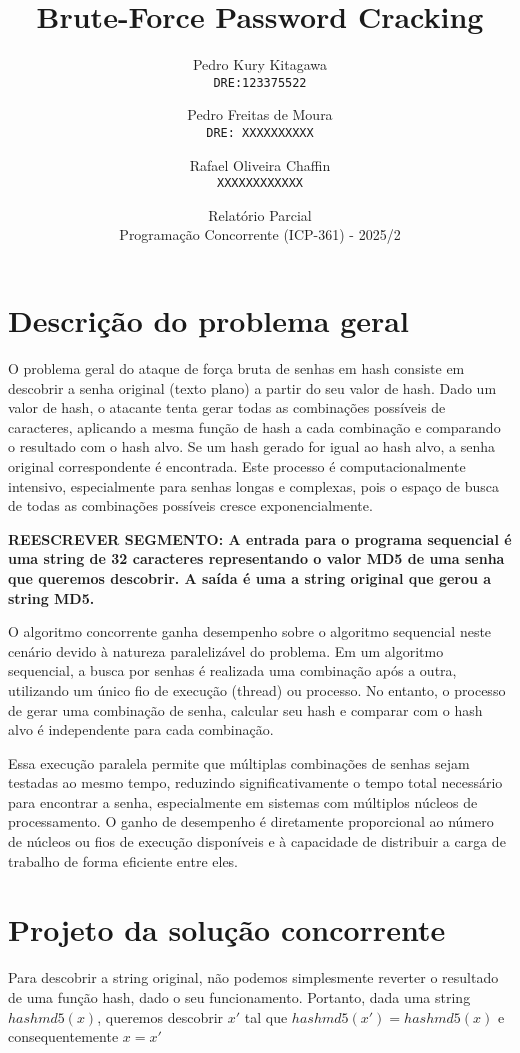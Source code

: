 \documentclass[12pt, a4paper]{article}
\title{Brute-Force Password Cracking}
\author{
  Pedro Kury Kitagawa\\
  \texttt{DRE:123375522}
  \and
  Pedro Freitas de Moura\\
  \texttt{DRE: XXXXXXXXXX}
  \and
  Rafael Oliveira Chaffin\\
  \texttt{XXXXXXXXXXXX}
}
\date{Relatório Parcial \\ Programação Concorrente (ICP-361) - 2025/2}
\begin{document}
\maketitle
\thispagestyle{empty}

\section{Descrição do problema geral}
O problema geral do ataque de força bruta de senhas em hash consiste em descobrir a senha original (texto plano) a partir do seu valor de hash. Dado um valor de hash, o atacante tenta gerar todas as combinações possíveis de caracteres, aplicando a mesma função de hash a cada combinação e comparando o resultado com o hash alvo. Se um hash gerado for igual ao hash alvo, a senha original correspondente é encontrada. Este processo é computacionalmente intensivo, especialmente para senhas longas e complexas, pois o espaço de busca de todas as combinações possíveis cresce exponencialmente.

\textbf{REESCREVER SEGMENTO: A entrada para o programa sequencial é uma string de 32 caracteres representando o valor MD5 de uma senha que queremos descobrir. A saída é uma a string original que gerou a string MD5.}

O algoritmo concorrente ganha desempenho sobre o algoritmo sequencial neste cenário devido à natureza paralelizável do problema. Em um algoritmo sequencial, a busca por senhas é realizada uma combinação após a outra, utilizando um único fio de execução (thread) ou processo. No entanto, o processo de gerar uma combinação de senha, calcular seu hash e comparar com o hash alvo é independente para cada combinação.

Essa execução paralela permite que múltiplas combinações de senhas sejam testadas ao mesmo tempo, reduzindo significativamente o tempo total necessário para encontrar a senha, especialmente em sistemas com múltiplos núcleos de processamento. O ganho de desempenho é diretamente proporcional ao número de núcleos ou fios de execução disponíveis e à capacidade de distribuir a carga de trabalho de forma eficiente entre eles.

\section{Projeto da solução concorrente}
Para descobrir a string original, não podemos simplesmente reverter o resultado de uma função hash, dado o seu funcionamento. Portanto, dada uma string $hashmd5(x)$, queremos descobrir $x'$ tal que $hashmd5(x')=hashmd5(x)$ e consequentemente $x = x'$ 
\end{document}

